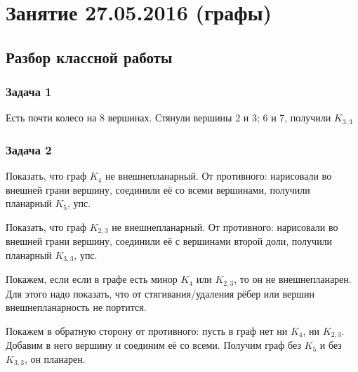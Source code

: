 \chapter{Занятие 27.05.2016 (графы)}

\section{Разбор классной работы}
\subsection{Задача 1}
	Есть почти колесо на 8 вершинах.
	Стянули вершины 2 и 3; 6 и 7, получили $K_{3,3}$

\subsection{Задача 2}
	Показать, что граф $K_4$ не внешнепланарный.
	От противного: нарисовали во внешней грани вершину, соединили её со всеми вершинами,
	получили планарный $K_5$, упс.

	Показать, что граф $K_{2,3}$ не внешнепланарный.
	От противного: нарисовали во внешней грани вершину, соединили её с вершинами второй доли,
	получили планарный $K_{3,3}$, упс.

	Покажем, если если в графе есть минор $K_4$ или $K_{2,3}$, то он не внешнепланарен.
	Для этого надо показать, что от стягивания/удаления рёбер или вершин внешнепланарность не портится.
	\TODO

	Покажем в обратную сторону от противного: пусть в граф нет ни $K_4$, ни $K_{2,3}$.
	Добавим в него вершину и соединим её со всеми.
	Получим граф без $K_5$ и без $K_{3,3}$, он планарен.
	\TODO

